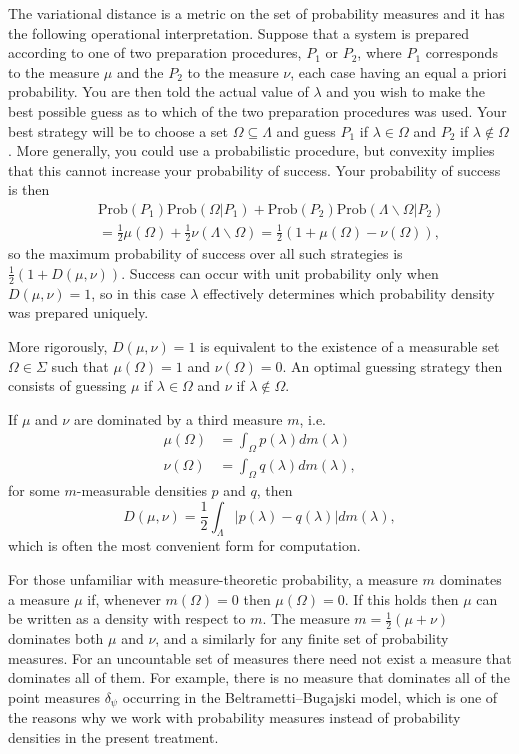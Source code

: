 \documentclass[DIV=calc,fontsize=12pt]{scrartcl} %
\theoremstyle{definition}
\theoremstyle{plain}
\begin{document}
The variational distance is a metric on the set of probability
measures and it has the following operational interpretation.  Suppose
that a system is prepared according to one of two preparation
procedures, $P_1$ or $P_2$, where $P_1$ corresponds to the measure
$\mu$ and the $P_2$ to the measure $\nu$, each case having an equal a
priori probability.  You are then told the actual value of $\lambda$
and you wish to make the best possible guess as to which of the two
preparation procedures was used.  Your best strategy will be to choose
a set $\Omega \subseteq \Lambda$ and guess $P_1$ if $\lambda \in
\Omega$ and $P_2$ if $\lambda \notin \Omega$.  More generally, you
could use a probabilistic procedure, but convexity implies that this
cannot increase your probability of success.  Your probability of
success is then
\begin{align}
&&\text{Prob}(P_1)\text{Prob}(\Omega|P_1) + \text{Prob}(P_2)
\text{Prob}(\Lambda \backslash \Omega|P_2)\nonumber\\
&&=\frac{1}{2}\mu(\Omega) + \frac{1}{2}\nu(\Lambda \backslash \Omega)
=\frac{1}{2} \left ( 1 + \mu(\Omega) - \nu(\Omega) \right ),
\end{align}
so the maximum probability of success over all such strategies is
$\frac{1}{2} \left ( 1 + D(\mu,\nu) \right )$.  Success can occur with
unit probability only when $D(\mu,\nu) = 1$, so in this case $\lambda$
effectively determines which probability density was prepared
uniquely.

More rigorously, $D(\mu,\nu) = 1$ is equivalent to the existence of a
measurable set $\Omega \in \Sigma$ such that $\mu(\Omega) = 1$ and
$\nu(\Omega) = 0$.  An optimal guessing strategy then consists of
guessing $\mu$ if $\lambda \in \Omega$ and $\nu$ if $\lambda \notin
\Omega$.

If $\mu$ and $\nu$ are dominated by a third measure $m$, i.e.
\begin{align}
\mu(\Omega) & = \int_{\Omega} p(\lambda)dm(\lambda) \\
\nu(\Omega) & = \int_{\Omega} q(\lambda) dm(\lambda),
\end{align}
for some $m$-measurable densities $p$ and $q$, then
\begin{equation}
\label{eq:POEM:intvar}
D(\mu, \nu) = \frac{1}{2} \int_{\Lambda} \left | p(\lambda) -
q(\lambda) \right | dm(\lambda),
\end{equation}
which is often the most convenient form for computation.

For those unfamiliar with measure-theoretic probability, a measure $m$
dominates a measure $\mu$ if, whenever $m(\Omega) = 0$ then
$\mu(\Omega) = 0$.  If this holds then $\mu$ can be written as a
density with respect to $m$.  The measure $m = \frac{1}{2} \left (\mu
+ \nu \right )$ dominates both $\mu$ and $\nu$, and a similarly for
any finite set of probability measures.  For an uncountable set of
measures there need not exist a measure that dominates all of them.
For example, there is no measure that dominates all of the point
measures $\delta_{\psi}$ occurring in the Beltrametti--Bugajski model,
which is one of the reasons why we work with probability measures
instead of probability densities in the present treatment.
\end{document}
